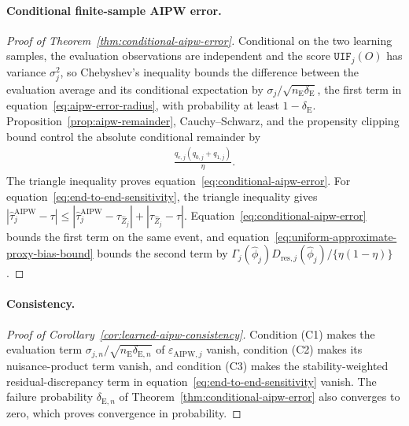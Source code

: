 \paragraph{Conditional finite-sample AIPW error.}
\begin{proof}[Proof of Theorem~\ref{thm:conditional-aipw-error}]
 Conditional on the two learning samples, the evaluation observations are independent and the score $\mathtt{UIF}_j(O)$ has variance $\sigma_j^2$, so Chebyshev's inequality bounds the difference between the evaluation average and its conditional expectation by $\sigma_j/\sqrt{n_{\mathrm E}\delta_{\mathrm E}}$, the first term in equation~\eqref{eq:aipw-error-radius}, with probability at least $1-\delta_{\mathrm E}$. Proposition~\ref{prop:aipw-remainder}, Cauchy--Schwarz, and the propensity clipping bound control the absolute conditional remainder by
\begin{align}
\frac{q_{e,j}(q_{0,j}+q_{1,j})}{\eta}.
\end{align}
The triangle inequality proves equation~\eqref{eq:conditional-aipw-error}.
For equation~\eqref{eq:end-to-end-sensitivity}, the triangle inequality gives $|\widehat\tau_j^{\mathrm{AIPW}}-\tau|\le|\widehat\tau_j^{\mathrm{AIPW}}-\tau_{\widehat Z_j}|+|\tau_{\widehat Z_j}-\tau|$. Equation~\eqref{eq:conditional-aipw-error} bounds the first term on the same event, and equation~\eqref{eq:uniform-approximate-proxy-bias-bound} bounds the second term by $\Gamma_j(\widehat\phi_j)D_{\mathrm{res},j}(\widehat\phi_j)/\{\eta(1-\eta)\}$.
\end{proof}

\paragraph{Consistency.}
\begin{proof}[Proof of Corollary~\ref{cor:learned-aipw-consistency}]
 Condition (C1) makes the evaluation term $\sigma_{j,n}/\sqrt{n_{\mathrm E}\delta_{\mathrm E,n}}$ of $\varepsilon_{\mathrm{AIPW},j}$ vanish, condition (C2) makes its nuisance-product term vanish, and condition (C3) makes the stability-weighted residual-discrepancy term in equation~\eqref{eq:end-to-end-sensitivity} vanish. The failure probability $\delta_{\mathrm E,n}$ of Theorem~\ref{thm:conditional-aipw-error} also converges to zero, which proves convergence in probability.
\end{proof}

